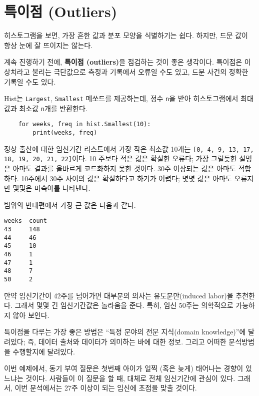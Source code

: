 \section{특이점 (Outliers)}

히스토그램을 보면, 가장 흔한 값과 분포 모양을 식별하기는 쉽다. 하지만, 드문 값이 항상 눈에 잘 뜨이지는 않는다.

계속 진행하기 전에, {\bf 특이점 (outliers)}을 점검하는 것이 좋은 생각이다. 특이점은 이상치라고 불리는 극단값으로 측정과 기록에서 오류일 수도 있고, 드분 사건의 정확한 기록일 수도 있다.


Hist는 {\tt Largest}, {\tt Smallest} 메쏘드를 제공하는데, 정수 {\tt n}을 받아 히스토그램에서 최대값과 최소값 {\tt n}개를 반환한다.


\begin{verbatim}
    for weeks, freq in hist.Smallest(10):
        print(weeks, freq)
\end{verbatim}

정상 출산에 대한 임신기간 리스트에서 가장 작은 최소값 10개는 {\tt [0, 4, 9, 13, 17, 18, 19, 20, 21, 22]}이다. 10 주보다 적은 값은 확실한 오류다; 가장 그럴듯한 설명은 아마도 결과를 올바르게 코드화하지 못한 것이다. 30주 이상되는 값은 아마도 적합하다. 10주에서 30주 사이의 값은 확실하다고 하기가 어렵다; 몇몇 값은 아마도 오류지만 몇몇은 미숙아를 나타낸다.


범위의 반대편에서 가장 큰 값은 다음과 같다.

%
\begin{verbatim}
weeks  count
43     148
44     46
45     10
46     1
47     1
48     7
50     2
\end{verbatim}

만약 임신기간이 42주를 넘어가면 대부분의 의사는 유도분만(induced labor)을 추천한다.
그래서 몇몇 긴 임신기간값은 놀라움을 준다. 특히, 임신 50주는 의학적으로 가능하지 않아 보인다.

특이점을 다루는 가장 좋은 방법은 ``특정 분야의 전문 지식(domain knowledge)''에 달려있다; 즉, 데이터 출처와 데이터가 의미하는 바에 대한 정보. 그리고 어떠한 분석방법을 수행할지에 달려있다.


이번 예제에서, 동기 부여 질문은 첫번째 아이가 일찍 (혹은 늦게) 태어나는 경향이 있느냐는 것이다.
사람들이 이 질문을 할 때, 대체로 전체 임신기간에 관심이 있다. 그래서, 이번 분석에서는 27주 이상이 되는 
임신에 초점을 맞출 것이다. 


